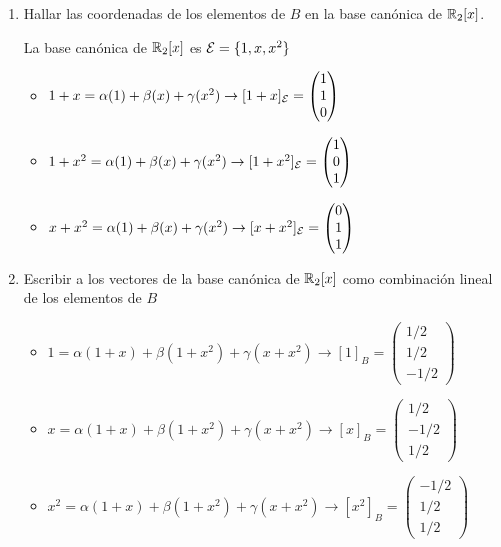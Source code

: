 \begin{enumerate}
\begin{mdframed}[style=s]
            \end{mdframed}
        \item Hallar las coordenadas de los elementos de $B$ en la base canónica de $\mathbb{R}_2[x]$.
            \begin{mdframed}[style=s]
                La base canónica de $\mathbb{R}_2[x]$ es $\mathcal{E}=\{1,x,x^2\}$
                \begin{itemize}
                    \item $1+x=\alpha(1)+\beta(x)+\gamma(x^2)\to[1+x]_{\mathcal{E}}=\begin{pmatrix}
                            1\\1\\0
                        \end{pmatrix}$
                    \item $1+x^2=\alpha(1)+\beta(x)+\gamma(x^2)\to[1+x^2]_{\mathcal{E}}=\begin{pmatrix}
                            1\\0\\1
                        \end{pmatrix}$
                    \item $x+x^2=\alpha(1)+\beta(x)+\gamma(x^2)\to[x+x^2]_{\mathcal{E}}=\begin{pmatrix}
                            0\\1\\1
                        \end{pmatrix}$
                \end{itemize}
            \end{mdframed}
        \item Escribir a los vectores de la base canónica de $\mathbb{R}_2[x]$ como combinación lineal de los elementos de $B$
            \begin{mdframed}[style=s]
                \begin{itemize}
                    \item $1=\alpha(1+x)+\beta(1+x^2)+\gamma(x+x^2)\to[1]_B=\begin{pmatrix}
                            1/2\\1/2\\-1/2
                        \end{pmatrix}$
                    \item $x=\alpha(1+x)+\beta(1+x^2)+\gamma(x+x^2)\to[x]_B=\begin{pmatrix}
                            1/2\\-1/2\\1/2
                        \end{pmatrix}$
                    \item $x^2=\alpha(1+x)+\beta(1+x^2)+\gamma(x+x^2)\to[x^2]_B=\begin{pmatrix}
                            -1/2\\1/2\\1/2
                        \end{pmatrix}$
                \end{itemize}
            \end{mdframed}
    \end{enumerate}